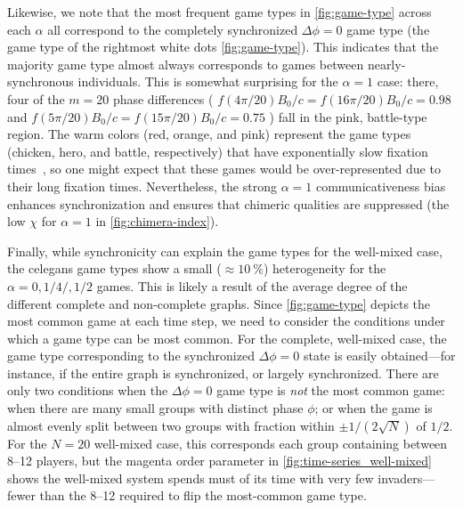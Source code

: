 \documentclass[pdflatex,lineno,referee,sn-mathphys-ay]{sn-jnl}
\begin{document}
Likewise, we note that the most frequent game types
in \cref{fig:game-type} across each $\alpha$ all correspond
to the completely synchronized $\Delta \phi = 0$ game type
(\ie the game type of the rightmost white dots \cref{fig:game-type}).
This indicates that the majority game type almost always
corresponds to games between nearly-synchronous individuals.
This is somewhat surprising for the $\alpha = 1$ case:
there, four of the $m = 20$ phase differences
(
$f(4\pi/20) B_0/c = f(16\pi/20) B_0/c = \num{0.98}$
and
$f(5\pi/20) B_0/c = f(15\pi/20) B_0/c = \num{0.75}$
)
fall in the pink, battle-type region.
The warm colors (red, orange, and pink)
represent the game types (chicken, hero, and battle, respectively)
that have exponentially slow fixation times~\citep{antal2006fixation},
so one might expect that these games would be over-represented
due to their long fixation times.
Nevertheless, the strong $\alpha = 1$ communicativeness bias
enhances synchronization and ensures that
chimeric qualities are suppressed
(\cf the low $\chi$ for $\alpha = 1$ in \cref{fig:chimera-index}).

Finally, while synchronicity can explain the game types
for the
 well-mixed case,
the
 \gls{celegans} game types
show a small ($\approx \SI{10}{\percent}$)
heterogeneity for the $\alpha = 0,1/4/,1/2$ games.
This is likely a result of the average degree
of the different complete and non-complete graphs.
Since \cref{fig:game-type} depicts the most common game at each time step,
we need to consider the conditions under which a game type can be most common.
For the complete, well-mixed case, the game type corresponding
to the synchronized $\Delta \phi = 0$ state
is easily obtained---for instance, if the entire graph is synchronized,
or largely synchronized.
There are only two conditions when the $\Delta \phi = 0$ game type
is \emph{not} the most common game:
when there are many small groups with distinct phase $\phi$;
or when the game is almost evenly split between two groups
with fraction within $\pm 1/(2 \sqrt{N})$ of $1/2$.
For the $N = 20$ well-mixed case, this corresponds
each group containing between \numrange{8}{12} players,
but the magenta order parameter in \cref{fig:time-series_well-mixed}
shows the well-mixed system spends must of its time with very few invaders---fewer
than the \numrange{8}{12} required to flip the most-common game type.
\end{document}

